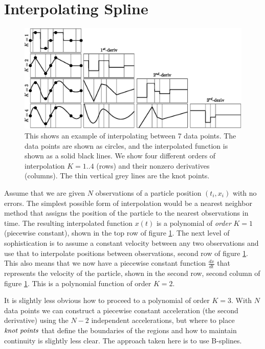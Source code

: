 \documentclass[10pt,journal]{IEEEtran}
\begin{document}
%
\section{Interpolating Spline}
\label{sec:interpolation}
%

\begin{figure}[h]
  \centerline{\includegraphics[width=39pc,angle=0]{figures/interpolation}}
  
  \caption{This shows an example of interpolating between 7 data points. The data points are shown as circles, and the interpolated function is shown as a solid black lines. We show four different orders of interpolation $K=1..4$ (rows) and their nonzero derivatives (columns). The thin vertical grey lines are the knot points.}
  \label{interpolation}
\end{figure}

Assume that we are given $N$ observations of a particle position $(t_i,x_i)$ with no errors. The simplest possible form of interpolation would be a nearest neighbor method that assigns the position of the particle to the nearest observations in time. The resulting interpolated function $x(t)$ is a polynomial of \emph{order} $K=1$ (piecewise constant), shown in the top row of figure \ref{interpolation}. The next level of sophistication is to assume a constant velocity between any two observations and use that to interpolate positions between observations, second row of figure \ref{interpolation}. This also means that we now have a piecewise constant function $\frac{dx}{dt}$ that represents the velocity of the particle, shown in the second row, second column of figure  \ref{interpolation}. This is a polynomial function of order $K=2$.

It is slightly less obvious how to proceed to a polynomial of order $K=3$. With $N$ data points we can construct a piecewise constant acceleration (the second derivative) using the $N-2$ independent accelerations, but where to place $\emph{knot points}$ that define the boundaries of the regions and how to maintain continuity is slightly less clear. The approach taken here is to use B-splines.
\end{document}
